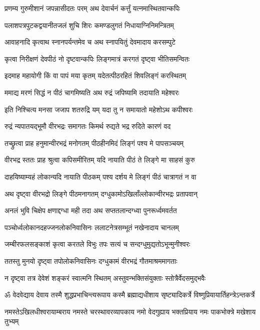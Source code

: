 \twolineshloka
{प्रणम्य गुरुमीशानं जपन्नासीदतः परम्}
{अथ देवार्चनं कर्त्तुं यत्नमास्थितवान्कपिः}%

\twolineshloka
{पलाशपत्रपुटकद्वयानीतजलं शुचि}
{शिरः कमण्डलुगतं निधायाग्निनिमन्त्रितम्}%

\twolineshloka
{आवाहनादि कृत्वाथ स्नानपर्यन्तमेव च}
{अथ स्नापयितुं देवमादाय करसम्पुटे}%

\twolineshloka
{कृत्वा निरीक्षणं देवपीठं नो दृष्टवान्कपिः}
{लिङ्गमात्रं करगतं दृष्ट्वा भीतिसमन्वितः}%

\twolineshloka
{इदमाह महायोगी किं वा पापं मया कृतम्}
{यदेतत्पीठरहितं शिवलिङ्गं करस्थितम्}%

\twolineshloka
{ममाद्य मरणं सिद्धं न पीठं चागमिष्यति}
{अथ रुद्रं जपिष्यामि तदायाति महेश्वरः}%

\twolineshloka
{इति निश्चित्य मनसा जजाप शतरुद्रि यम्}
{यदा तु न समायातो महेशोऽथ कपीश्वरः}%

\twolineshloka
{रुद्रं न्यपातयद्भूमौ वीरभद्रः समागतः}
{किमर्थ रुद्यते भद्र रुदिते कारणं वद}%

\twolineshloka
{तच्छ्रुत्वा प्राह हनुमान्वीरभद्रं मनोगतम्}
{पीठहीनमिदं लिङ्गं पश्य मे पापसञ्चयम्}%

\twolineshloka
{वीरभद्र स्ततः प्राह श्रुत्वा कपिसमीरितम्}
{यदि नायाति पीठं ते लिङ्गे मा साहसं कुरु}%

\twolineshloka
{दाहयिष्याम्यहं लोकान्यदि नायाति पीठकम्}
{पश्य दर्शय मे लिङ्गं पीठं चात्रागतं न वा}%

\twolineshloka
{अथ दृष्ट्वा वीरभद्रो लिङ्गे पीठमनागतम्}
{दग्धुकामोऽखिलाँल्लोकान्वीरभद्रः प्रतापवान्}%

\twolineshloka
{अनलं भुवि चिक्षेप क्षणाद्दग्धा मही तदा}
{अथ सप्ततलान्दग्ध्वा पुनरूर्ध्वमवर्तत}%

\twolineshloka
{पञ्चोर्ध्वलोकानदहज्जनलोकनिवासिनः}
{ललाटनेत्रसम्भूतं नखेनादाय चानलम्}%

\twolineshloka
{जम्बीरफलसङ्काशं कृत्वा करतले विभुः}
{तपः सत्यं च सन्दग्धुमुद्यतोऽभून्मुनीश्वरः}%

\twolineshloka
{ततस्तु मुनयो दृष्ट्वा तपोलोकनिवासिनः}
{दग्धुकामं वीरभद्रं गौतमाश्रममागताः}%

\twolineshloka
{न दृष्ट्वा तत्र देवेशं शङ्करं स्वात्मनि स्थितम्}
{अस्तुवन्भक्तिसंयुक्ताः स्तोत्रैर्वेदसमुद्भवैः}%

\twolineshloka
{ॐ वेदवेद्याय देवाय तस्मै शुद्धप्रभाचिन्त्यरूपाय कस्मै}
{ब्रह्माद्यधीशाय सृष्ट्यादिकर्त्रे विष्णुप्रियायार्तिहन्त्रेऽन्तकर्त्रे}%

\twolineshloka
{नमस्तेऽखिलधीश्वरायाम्बराय नमस्ते चरस्थावरव्यापकाय}
{नमो वेदगुह्याय भक्तप्रियाय नमः पाकभोक्त्रे मखेशाय तुभ्यम्}%

